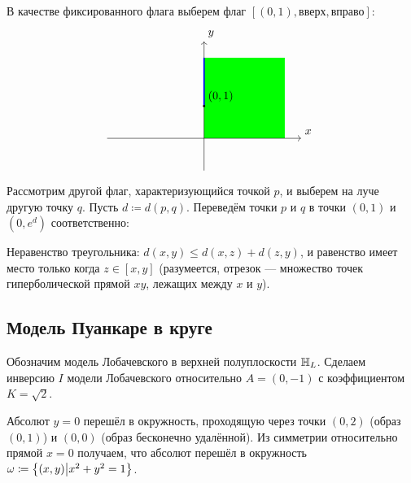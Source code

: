 \documentclass[a4paper]{report}
\begin{document}
{{{        В качестве фиксированного флага выберем флаг $[(0, 1), \text{вверх}, \text{вправо}]$:
        \[\begin{tikzpicture}
              \fill[green] (0, 0) rectangle (2.5, 2.5);
              \draw[->] (-3, 0) -- (3, 0) node[above right] {$x$};
              \draw[->] (0, -1) -- (0, 3) node[above right] {$y$};
              \draw[blue, very thick] (0, 1) -- (0, 2.5);
              \fill (0, 1) circle (1pt) node [above right] {$(0, 1)$};
        \end{tikzpicture}\]

        Рассмотрим другой флаг, характеризующийся точкой $p$, и выберем на луче другую точку $q$.
    Пусть $d \coloneqq d(p, q)$.
        Переведём точки $p$ и $q$ в точки $(0, 1)$ и $(0, e^d)$ соответственно:
    }}
    \item Неравенство треугольника: $d(x, y) \le d(x, z) + d(z, y)$, и равенство имеет место только когда $z \in [x, y]$ (разумеется, отрезок --- множество точек гиперболической прямой $xy$, лежащих между $x$ и $y$).
    }
    \subsection{Модель Пуанкаре в круге}
    Обозначим модель Лобачевского в верхней полуплоскости $\mathbb{H}_L$.
    Сделаем инверсию $I$ модели Лобачевского относительно $A = (0, -1)$ с коэффициентом $K = \sqrt{2}$.

    Абсолют $y = 0$ перешёл в окружность, проходящую через точки $(0, 2)$ (образ $(0, 1)$) и $(0, 0)$ (образ бесконечно удалённой).
    Из симметрии относительно прямой $x = 0$ получаем, что абсолют перешёл в окружность $\omega \coloneqq \left\{(x, y)\middle|x^2+y^2=1\right\}$.
\end{document}
